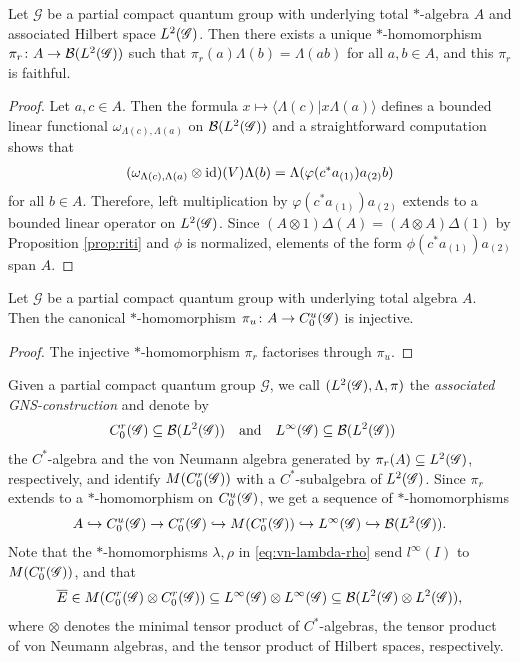 \begin{Prop} \label{prop:gns} Let $\mathscr{G}$ be a partial compact
  quantum group with underlying total $*$-algebra $A$ and associated
  Hilbert space $L^{2}(\mathscr{G})$. Then there exists a unique $*$-homomorphism
  $\pi_{r}\colon A \to {\cal B}(L^{2}(\mathscr{G}))$ such that
  $\pi_{r}(a)\Lambda(b)=\Lambda(ab)$ for all $a,b\in A$, and this
  $\pi_{r}$ is faithful.
\end{Prop}
\begin{proof} 
  Let $a,c \in A$. Then the formula $x \mapsto \langle
\Lambda(c) | x\Lambda(a)\rangle$ defines a bounded linear functional
  $\omega_{\Lambda(c),\Lambda(a)}$ on ${\cal B}(L^{2}(\mathscr{G}))$ and a
  straightforward computation shows that
  \begin{align*}
    (\omega_{\Lambda(c),\Lambda(a)}\otimes \operatorname{id})(V)\Lambda(b) =
    \Lambda(\varphi(c^*a_{(1)})a_{(2)}b)
  \end{align*}
  for all $b\in A$. Therefore, left multiplication by
  $\varphi(c^*a_{(1)})a_{(2)}$ extends to a bounded linear operator on $L^{2}(\mathscr{G})$.
 Since $(A\otimes 1)\Delta(A) = (A\otimes
  A)\Delta(1)$ by Proposition \ref{prop:riti} and $\phi$ is
  normalized,  elements of the form $\phi(c^{*}a_{(1)})a_{(2)}$ span
  $A$. 
\end{proof}
\begin{Cor}
  Let $\mathscr{G}$ be a partial compact quantum group with underlying
  total algebra $A$. Then the
  canonical $*$-homomorphism $\pi_{u} \colon A \to C^{u}_{0}(\mathscr{G})$ is injective.
\end{Cor}
\begin{proof}
  The injective $*$-homomorphism $\pi_{r}$ factorises through
  $\pi_{u}$.
\end{proof}
Given a partial compact quantum group $\mathscr{G}$, we call
$(L^{2}(\mathscr{G}),\Lambda,\pi)$ the \emph{associated GNS-construction} and denote by
\begin{align}
  C^{r}_{0}(\mathscr{G}) &\subseteq {\cal B}(L^{2}(\mathscr{G})) &&\text{and} & L^{\infty}(\mathscr{G}) &\subseteq {\cal B}(L^{2}(\mathscr{G}))
\end{align}
the $C^{*}$-algebra and the von Neumann algebra generated by $\pi_{r}(A)
\subseteq L^{2}(\mathscr{G})$, respectively, and identify $M(C^{r}_{0}(\mathscr{G}))$ with a
$C^{*}$-subalgebra of $L^{2}(\mathscr{G})$.  Since $\pi_{r}$ extends to a
$*$-homomorphism on $C^{u}_{0}(\mathscr{G})$, we get a sequence of $*$-homomorphisms
\begin{align*}
A \hookrightarrow C^{u}_{0}(\mathscr{G}) \to 
  C^{r}_{0}(\mathscr{G}) \hookrightarrow M(C^{r}_{0}(\mathscr{G})) \hookrightarrow
L^{\infty}(\mathscr{G}) \hookrightarrow {\cal B}(L^{2}(\mathscr{G})).
\end{align*}
Note that
 the $*$-homomorphisms $\lambda,\rho$ in
\eqref{eq:vn-lambda-rho} send $l^{\infty}(I)$ to $M(C^{r}_{0}(\mathscr{G}))$, and that
\begin{align*}
  \overline{E} \in M(C^{r}_{0}(\mathscr{G}) \otimes C^{r}_{0}(\mathscr{G})) \subseteq L^{\infty}(\mathscr{G}) \otimes L^{\infty}(\mathscr{G})
  \subseteq {\cal B}(L^{2}(\mathscr{G}) \otimes L^{2}(\mathscr{G})),
\end{align*}
where $\otimes$ denotes the minimal tensor product
of $C^{*}$-algebras, the tensor product of von Neumann algebras, and
the tensor product of Hilbert spaces, respectively.

